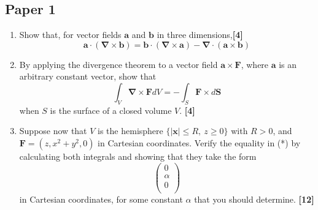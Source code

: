 \documentclass[a4paper]{article}
\begin{document}
\subsection{Paper 1}
\begin{qns}\leavevmode
\begin{enumerate}[label=(\alph*)]
    \item Show that, for vector fields $\mathbf{a}$ and $\mathbf{b}$ in three dimensions,\hfill \textbf{[4]}
$$\mathbf{a}\cdot(\boldsymbol{\nabla}\times\mathbf{b})=\mathbf{b}\cdot(\boldsymbol{\nabla}\times\mathbf{a})-\boldsymbol{\nabla}\cdot(\mathbf{a}\times\mathbf{b})$$

\item  By applying the divergence theorem to a vector field $\mathbf{a}\times\mathbf{F}$, where $\mathbf{a}$ is an arbitrary constant vector, show that
\begin{equation}
    \int_V\boldsymbol{\nabla}\times\mathbf{F}dV=-\int_S\mathbf{F}\times d\mathbf{S}\tag{*}
\end{equation}
when $S$ is the surface of a closed volume $V$. \hfill \textbf{[4]}
\item Suppose now that $V$ is the hemisphere $\{|\mathbf{x}| \leq R, ~z \geq 0\}$ with $R > 0$, and $\mathbf{F} =(z, x^2 + y^2, 0)$ in Cartesian coordinates. Verify the equality in (*) by calculating both integrals and showing that they take the form
$$\begin{pmatrix}0\\\alpha\\0\\\end{pmatrix}$$
in Cartesian coordinates, for some constant $\alpha$ that you should determine. \hfill\textbf{[12]}
\end{enumerate}
\end{qns}
\end{document}
